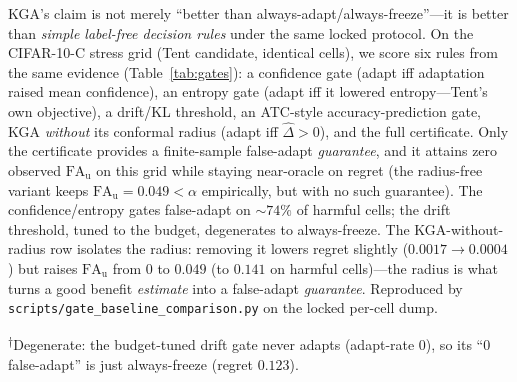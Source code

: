 \documentclass[conference]{IEEEtran}
\theoremstyle{plain}
\theoremstyle{definition}
\theoremstyle{remark}
\begin{document}
\textsc{KGA}'s claim is not merely ``better than always-adapt/always-freeze''---it is better than
\emph{simple label-free decision rules} under the same locked protocol. On the CIFAR-10-C stress grid
(Tent candidate, identical cells), we score six rules from the same evidence
(Table~\ref{tab:gates}): a confidence gate (adapt iff adaptation raised mean confidence), an entropy
gate (adapt iff it lowered entropy---Tent's own objective), a drift/KL threshold, an ATC-style
accuracy-prediction gate, \textsc{KGA} \emph{without} its conformal radius (adapt iff
$\widehat\Delta>0$), and the full certificate. Only the certificate provides a finite-sample
false-adapt \emph{guarantee}, and it attains zero observed $\mathrm{FA}_{\mathrm u}$ on this grid while
staying near-oracle on regret (the radius-free variant keeps $\mathrm{FA}_{\mathrm u}{=}0.049{<}\alpha$
empirically, but with no such guarantee). The
confidence/entropy gates false-adapt on ${\sim}74\%$ of harmful cells; the drift threshold, tuned to
the budget, degenerates to always-freeze. The \textsc{KGA}-without-radius row isolates the radius:
removing it lowers regret slightly ($0.0017\!\to\!0.0004$) but raises $\mathrm{FA}_{\mathrm u}$ from
$0$ to $0.049$ (to $0.141$ on harmful cells)---the radius is what turns a good benefit \emph{estimate}
into a false-adapt \emph{guarantee}. Reproduced by \texttt{scripts/gate\_baseline\_comparison.py} on
the locked per-cell dump.

\begin{table}[t]\centering\small
\caption{\textbf{Decision-baseline comparison, CIFAR-10-C stress grid} (Tent candidate, $n{=}432$
cells, $149$ harmful, $\alpha{=}0.1$). Lower regret and lower $\mathrm{FA}_{\mathrm u}$ are better.
Only the conformal certificate keeps $\mathrm{FA}_{\mathrm u}{=}0$ on the full grid and on harmful
cells while staying near-oracle.}
\label{tab:gates}

{\footnotesize\textsuperscript{$\dagger$}Degenerate: the budget-tuned drift gate never adapts
(adapt-rate $0$), so its ``$0$ false-adapt'' is just always-freeze (regret $0.123$).}
\end{table}
\end{document}
